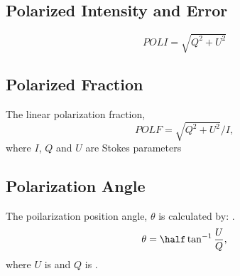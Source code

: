 \subsection{Polarized Intensity and Error}

\begin{equation}
    POLI = \sqrt{Q^2 + U^2}
    \label{eq: POLI}
\end{equation}


\subsection{Polarized Fraction}
The linear polarization fraction,
\begin{equation}
    POLF = \sqrt{Q^2+U^2}/I,
    \label{eq: POLF}
\end{equation}
\noindent where $I$, $Q$ and $U$ are Stokes parameters
\subsection{Polarization Angle}

The poilarization position angle, $\theta$ is calculated by: . 
\begin{equation}
\theta = \half \tan ^{-1} \frac{U}{Q},
    \label{eq: PA}
\end{equation}
\noindent where $U$ is \SU and $Q$ is \SQ.